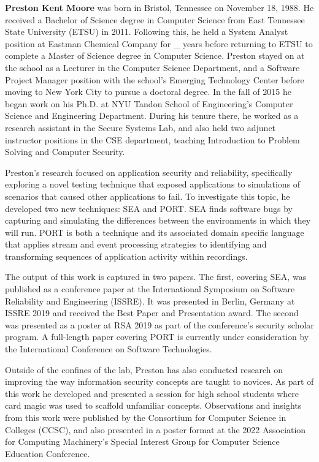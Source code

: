 

\textbf{Preston Kent Moore} was born in Bristol, Tennessee on November 18, 1988.  He received a Bachelor of Science degree in Computer Science from East Tennessee State University (ETSU) in 2011.
Following this, he held a System Analyst position at Eastman Chemical Company for _ years
before returning to ETSU to complete a Master of Science degree in Computer Science.
Preston stayed on at the school as a Lecturer in the Computer Science Department, and a Software Project Manager position with the school's Emerging Technology Center before moving to New York City to pursue a doctoral degree.
In the fall of 2015 he began work on his Ph.D. at NYU Tandon School of Engineering's Computer Science and Engineering Department. During his tenure there, he worked as a research assistant in the Secure Systems Lab, and also held two adjunct instructor positions in the CSE department, teaching Introduction to Problem Solving and Computer Security.

Preston's research focused on application security and reliability, specifically
exploring a novel testing technique that exposed applications to simulations of scenarios that caused other applications to fail.
To investigate this topic, he developed two new techniques: SEA and PORT.
SEA finds software bugs by capturing and simulating the differences between the environments in which they will run.
PORT is both a technique and its associated domain specific language that applies stream and event processing strategies to identifying and transforming  sequences of application activity within recordings.

The output of  this work is captured in two papers. The first, covering SEA, was published as a conference paper at the International Symposium on Software Reliability and Engineering (ISSRE).
It was presented in Berlin, Germany at ISSRE 2019 and received the Best Paper and Presentation award.
The second was presented as a poster at RSA 2019 as part of the conference's security scholar program.
A full-length paper covering PORT is currently under consideration by the International Conference on Software Technologies.

Outside of the confines of the lab, Preston has also conducted research on improving the way information security concepts are taught to novices.
As part of this work he developed and presented a session for high school students where card magic was used to scaffold unfamiliar concepts.
Observations and insights from this work were published by the Consortium for Computer Science in Colleges (CCSC), and also presented in a poster format at the 2022 Association for Computing Machinery's Special Interest Group for Computer Science Education Conference.


